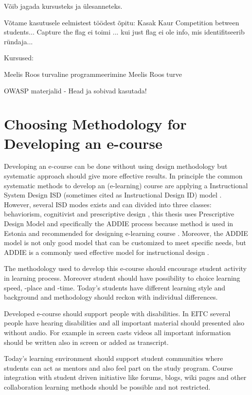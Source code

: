 Võib jagada kursusteks ja ülesanneteks.

Võtame kasutusele eelmistest töödest õpitu:
Kasak Kaur \citep{KasakKaur}
Competition between students...
Capture the flag ei toimi ... kui just flag ei ole info, mis identifitseerib ründaja...

Kursused:

Meelis Roos turvaline programmeerimine
Meelis Roos turve 

OWASP materjalid - Head ja sobivad kasutada!




\section{Choosing Methodology for Developing an e-course}

Developing an e-course can be done without using design methodology but systematic approach should give more effective results. In principle the common systematic methods to develop an (e-learning) course are applying a Instructional System Design \gls{ISD} (sometimes cited as  Instructional Design \gls{ID}) model \citep{website:id_models}. However, several \gls{ISD} modes exists and can divided into three classes: behaviorism, cognitivist and prescriptive design \citep{website:id_models}, this thesis uses Prescriptive Design Model and specifically the \gls{ADDIE} process because method is used in Estonia and recommended for designing e-learning course \citep[p.~5]{OppeArenduskeskus2010}. Moreover, the \gls{ADDIE} model is not only good model that can be customized to meet specific needs, but ADDIE is a commonly used effective model for instructional  design \citep{ieee_addie_1607206}.

The methodology used to develop this e-course should encourage student activity in learning process. Moreover student should have possibility to choice learning speed, -place and -time. Today's students have different learning style and background and methodology should reckon with individual differences.

Developed e-course should support people with disabilities. In \gls{EITC} several people have hearing disabilities and all important material should presented also without audio. For example in screen casts videos all important information should be written also in screen or added as transcript.

Today’s learning environment should support student communities where students can act as mentors and also feel part on the study program. Course integration with student driven initiative like forums, blogs, wiki pages and other collaboration learning methods should be possible and not restricted.

